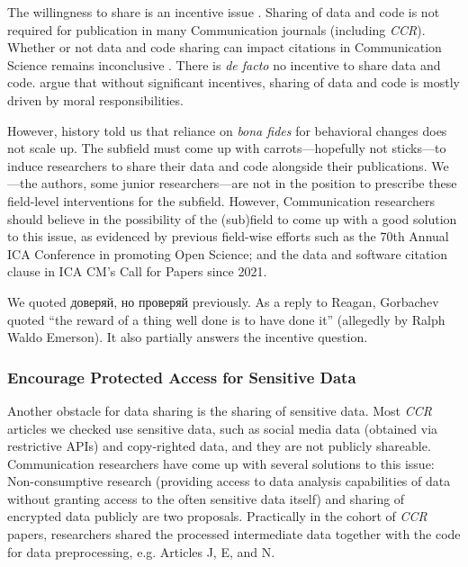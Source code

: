 The willingness to share is an incentive issue \parencite[]{akdeniz:2023:S}. Sharing of data and code is not required for publication in many Communication journals (including \textit{CCR}). Whether or not data and code sharing can impact citations in Communication Science remains inconclusive \parencite[]{markowitz:2021:TAE}. There is \textit{de facto} no incentive to share data and code. \textcite{schoch:2023:CRC} argue that without significant incentives, sharing of data and code is mostly driven by moral responsibilities. %

However, history told us that reliance on \textit{bona fides} for behavioral changes does not scale up. The subfield must come up with carrots---hopefully not sticks---to induce researchers to share their data and code alongside their publications. We---the authors, some junior researchers---are not in the position to prescribe these field-level interventions for the subfield. However, Communication researchers should believe in the possibility of the (sub)field to come up with a good solution to this issue, as evidenced by previous field-wise efforts such as the 70th Annual ICA Conference in promoting Open Science; and the data and software citation clause in ICA CM's Call for Papers since 2021.

We quoted доверяй, но проверяй previously. As a reply to Reagan, Gorbachev quoted ``the reward of a thing well done is to have done it'' (allegedly by Ralph Waldo Emerson). It also partially answers the incentive question.

\subsubsection{Encourage Protected Access for Sensitive Data}

Another obstacle for data sharing is the sharing of sensitive data. Most \textit{CCR} articles we checked use sensitive data, such as social media data (obtained via restrictive APIs) and copy-righted data, and they are not publicly shareable. Communication researchers have come up with several solutions to this issue: Non-consumptive research \parencite{van:2020:TSY, nonconsumptive} (providing access to data analysis capabilities of data without granting access to the often sensitive data itself) and sharing of encrypted data publicly \parencite[]{vanccs} are two proposals. Practically in the cohort of \textit{CCR} papers, researchers shared the processed intermediate data together with the code for data preprocessing, e.g. Articles J, E, and N.

